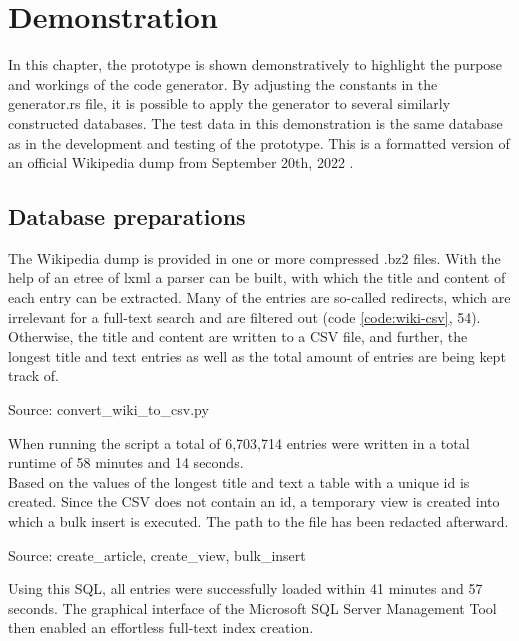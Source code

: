 \newpage
\section{Demonstration}
In this chapter, the prototype is shown demonstratively to highlight the purpose and workings of the code generator. By adjusting the constants in the generator.rs file, it is possible to apply the generator to several similarly constructed databases. The test data in this demonstration is the same database as in the development and testing of the prototype. This is a formatted version of an official Wikipedia dump from September 20th, 2022 \parencite[see][n.p.]{wikimedia_enwiki_nodate}.
\subsection{Database preparations}
The Wikipedia dump is provided in one or more compressed .bz2 files. With the help of an etree of lxml a parser can be built, with which the title and content of each entry can be extracted. Many of the entries are so-called redirects, which are irrelevant for a full-text search and are filtered out (code \ref{code:wiki-csv}, 54). Otherwise, the title and content are written to a \ac{CSV} file, and further, the longest title and text entries as well as the total amount of entries are being kept track of.
\begin{codeenv}
    \label{code:wiki-csv}
    
    \centerline{Source: convert\_wiki\_to\_csv.py}
\end{codeenv}
When running the script a total of 6,703,714 entries were written in a total runtime of 58 minutes and 14 seconds.\\
Based on the values of the longest title and text a table with a unique id is created. Since the \ac{CSV} does not contain an id, a temporary view is created into which a bulk insert is executed. The path to the file has been redacted afterward.
\begin{codeenv}
    \label{code:wiki-sql}
    
    
    
    \centerline{Source: create\_article, create\_view, bulk\_insert}
\end{codeenv}
Using this \ac{SQL}, all entries were successfully loaded within 41 minutes and 57 seconds. The graphical interface of the Microsoft SQL Server Management Tool then enabled an effortless full-text index creation.
